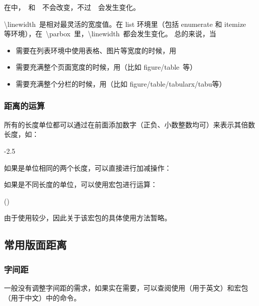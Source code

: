 在中， 和  不会改变，不过  会发生变化。

\textbackslash{linewidth} 是相对最灵活的宽度值。在 list 环境里（包括 enumerate 和 itemize 等环境），在 \textbackslash{parbox} 里，\textbackslash{linewidth} 都会发生变化。
总的来说，当
\begin{itemize}
    \item 需要在列表环境中使用表格、图片等宽度的时候，用
    \item 需要充满整个页面宽度的时候，用（比如 figure/table 等）
    \item 需要充满整个分栏的时候，用（比如 figure/table/tabularx/tabu等）
\end{itemize}



\subsubsection{距离的运算}
所有的长度单位都可以通过在前面添加数字（正负、小数整数均可）来表示其倍数长度，如：
\begin{texcode}
    -2.5\textwidth        
\end{texcode}
如果是单位相同的两个长度，可以直接进行加减操作：
\begin{texcode}
    \fboxsep
\end{texcode}
如果是不同长度的单位，可以使用宏包进行运算：
\begin{texcode}
    \dimexpr (\tabcolsep)
\end{texcode}
由于使用较少，因此关于该宏包的具体使用方法暂略。

\subsection{常用版面距离}\label{sub:normal-page-dist}
\subsubsection{字间距}
    一般没有调整字间距的需求，如果实在需要，可以查阅使用（用于英文）和宏包（用于中文）中的命令。
